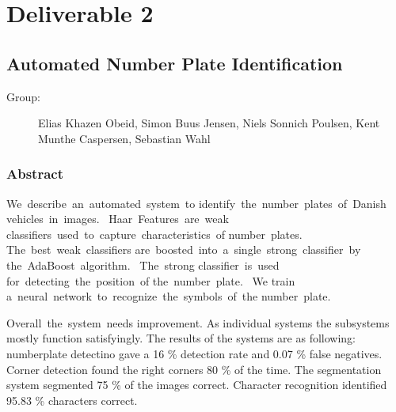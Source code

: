 \section{Deliverable 2}

\subsection{Automated Number Plate Identification}
\begin{description}
  \item [Group:] Elias Khazen Obeid, Simon Buus Jensen, Niels Sonnich
		Poulsen, Kent Munthe Caspersen, Sebastian Wahl
\end{description}

\subsubsection{Abstract}

We describe an automated system to identify the number plates of Danish vehicles in images. 
Haar Features are weak classifiers used to capture characteristics of number \-pla\-tes. 
\-The best weak classifiers are boosted into a single strong classifier by the AdaBoost algorithm. 
The strong classifier is used \-for detecting the position of the number plate. 
We train a neural network to recognize the symbols of the number plate.

Overall the system needs improvement. 
As individual systems the subsystems mostly function satisfyingly. 
The results of the systems are as following: 
numberplate detectino gave a 16 \% detection rate and 0.07 \% false negatives.
Corner detection found the right corners 80 \% of the time. 
The segmentation system segmented 75 \% of the images correct. 
Character recognition identified 95.83 \% characters correct.
